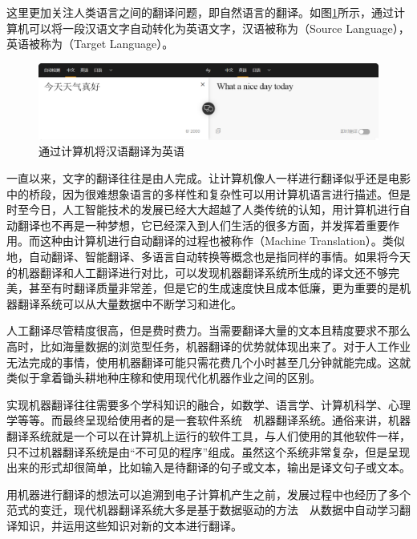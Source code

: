 \parinterval 这里更加关注人类语言之间的翻译问题，即自然语言的翻译。如图\ref{fig:1-1}所示，通过计算机可以将一段汉语文字自动转化为英语文字，汉语被称为{\small{}}（Source Language），英语被称为{\small{}}（Target Language）。

\begin{figure}[htp]
    \centering
\includegraphics[scale=0.2]{./Chapter1/Figures/figure-zh_en-example.png}
    \caption{通过计算机将汉语翻译为英语}
    \label{fig:1-1}
\end{figure}

\parinterval 一直以来，文字的翻译往往是由人完成。让计算机像人一样进行翻译似乎还是电影中的桥段，因为很难想象语言的多样性和复杂性可以用计算机语言进行描述。但是时至今日，人工智能技术的发展已经大大超越了人类传统的认知，用计算机进行自动翻译也不再是一种梦想，它已经深入到人们生活的很多方面，并发挥着重要作用。而这种由计算机进行自动翻译的过程也被称作{\small{}}（Machine Translation）。类似地，自动翻译、智能翻译、多语言自动转换等概念也是指同样的事情。如果将今天的机器翻译和人工翻译进行对比，可以发现机器翻译系统所生成的译文还不够完美，甚至有时翻译质量非常差，但是它的生成速度快且成本低廉，更为重要的是机器翻译系统可以从大量数据中不断学习和进化。

\parinterval 人工翻译尽管精度很高，但是费时费力。当需要翻译大量的文本且精度要求不那么高时，比如海量数据的浏览型任务，机器翻译的优势就体现出来了。对于人工作业无法完成的事情，使用机器翻译可能只需花费几个小时甚至几分钟就能完成。这就类似于拿着锄头耕地种庄稼和使用现代化机器作业之间的区别。

\parinterval 实现机器翻译往往需要多个学科知识的融合，如数学、语言学、计算机科学、心理学等等。而最终呈现给使用者的是一套软件系统\ \dash\ 机器翻译系统。通俗来讲，机器翻译系统就是一个可以在计算机上运行的软件工具，与人们使用的其他软件一样，只不过机器翻译系统是由“不可见的程序”组成。虽然这个系统非常复杂，但是呈现出来的形式却很简单，比如输入是待翻译的句子或文本，输出是译文句子或文本。

\parinterval 用机器进行翻译的想法可以追溯到电子计算机产生之前，发展过程中也经历了多个范式的变迁，现代机器翻译系统大多是基于数据驱动的方法\ \dash\ 从数据中自动学习翻译知识，并运用这些知识对新的文本进行翻译。

